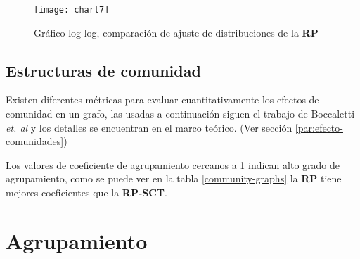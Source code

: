 \begin{figure}[ht]
\caption{Gráfico log-log, comparación de ajuste de distribuciones de la \textbf{\acrshort{RP}}}
\label{fig:ajusteDistribucionesRP}
\centering
\texttt{[image: chart7]}
\end{figure}


\subsection{Estructuras de comunidad}
Existen diferentes métricas para evaluar cuantitativamente los efectos de comunidad en un grafo, las usadas  a continuación siguen el trabajo de Boccaletti \textit{et. al}\cite{BOCCALETTI2006} y los detalles se encuentran en el marco teórico. (Ver sección \ref{par:efecto-comunidades})

\begin{table}[htb]
\centering
\caption{Métricas de efectos de comunidad en redes}
\label{community-graphs}
\end{table}

Los valores de coeficiente de agrupamiento cercanos a 1 indican alto grado de agrupamiento, como se puede ver en la tabla \ref{community-graphs} la \textbf{\acrshort{RP}} tiene mejores coeficientes que la \textbf{\acrshort{RP-SCT}}. 

\section{Agrupamiento}

